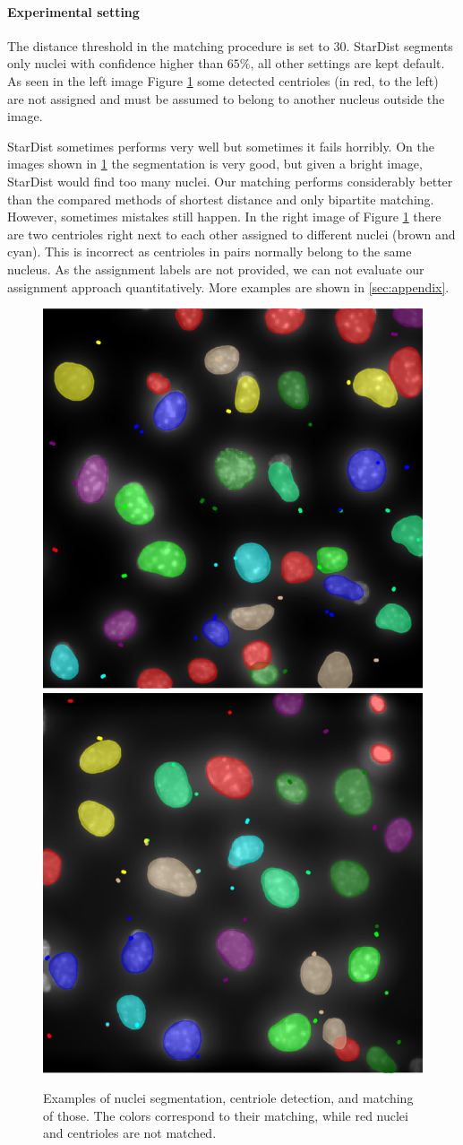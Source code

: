 \documentclass[9pt,conference,compsocconf, article]{IEEEtran}
\begin{document}
\paragraph{Experimental setting}
The distance threshold in the matching procedure is set to $30$. 
StarDist segments only nuclei with confidence higher than $65\%$, all other settings are kept default. As seen in the left image Figure \ref{fig:cen_nuc_match} some detected centrioles (in red, to the left) are not assigned and must be assumed to belong to another nucleus outside the image.

StarDist sometimes performs very well but sometimes it fails horribly. On the images shown in \ref{fig:cen_nuc_match} the segmentation is very good, but given a bright image, StarDist would find too many nuclei. Our matching performs considerably better than the compared methods of shortest distance and only bipartite matching. However, sometimes mistakes 
still happen. In the right image of Figure \ref{fig:cen_nuc_match} there are two centrioles right next to each other assigned to different nuclei (brown and cyan). This is incorrect as centrioles in pairs normally belong to the same nucleus. As the assignment labels are not provided, we can not evaluate our assignment approach quantitatively. More examples are shown in \ref{sec:appendix}. 

\begin{figure}[h!]
    \centering
    
        \includegraphics[width=0.45\linewidth]{images/Matching1.png}
        \includegraphics[width=0.45\linewidth]{images/Matching2.png}
    \caption{
    Examples of nuclei segmentation, centriole detection, and matching of those. The colors correspond to their matching, while red nuclei and centrioles are not matched.
    }
    \label{fig:cen_nuc_match}
\end{figure}
\end{document}
